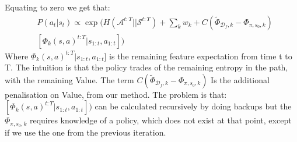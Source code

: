 \documentclass[letterpaper]{article}
\DeclareMathOperator*{\argmax}{\arg\!\max}
\newcommand{\sw}[1]{\textcolor{red}{SW: #1}}
\newcommand{\sw}[1]{}
\begin{document}
Equating to zero we get that:
\begin{equation}
	\begin{split}
	&P(a_t|s_t) \propto \exp\Big(H(\mathcal{A}^{t:T}||\mathcal{S}^{t:T})+\sum_k w_k + C(\widetilde{\Phi}_{\mathcal{D}_f,k}-\Phi_{\pi,s_0,k})\\
	 &[\Phi_k(s,a)^{t:T}|s_{1:t},a_{1:t}]\Big)
	\end{split}
\end{equation}
Where $\Phi_k(s,a)^{t:T}|s_{1:t},a_{1:t}]$ is the remaining feature expectation from time t to T.
The intuition is that the policy trades of the remaining entropy in the path, with the remaining Value. The term $C(\widetilde{\Phi}_{\mathcal{D}_f,k}-\Phi_{\pi,s_0,k})$ Is the additional penalisation on Value, from our method. The problem is that: $[\Phi_k(s,a)^{t:T}|s_{1:t},a_{1:t}])$ can be calculated recursively by doing backups but the $\Phi_{\pi,s_0,k}$ requires knowledge of a policy, which does not exist at that point, except if we use the one from the previous iteration.
	



\end{document}
